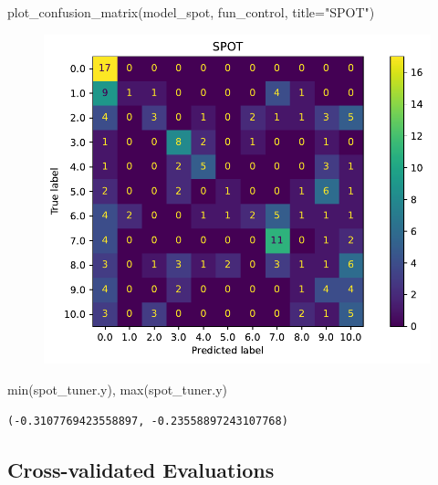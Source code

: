 \documentclass[
  letterpaper,
  DIV=11,
  numbers=noendperiod]{scrreprt}
\newenvironment{Shaded}{\begin{snugshade}}{\end{snugshade}}
\newcommand{\BuiltInTok}[1]{\textcolor[rgb]{0.00,0.23,0.31}{#1}}
\newcommand{\NormalTok}[1]{\textcolor[rgb]{0.00,0.23,0.31}{#1}}
\newcommand{\OperatorTok}[1]{\textcolor[rgb]{0.37,0.37,0.37}{#1}}
\newcommand{\StringTok}[1]{\textcolor[rgb]{0.13,0.47,0.30}{#1}}
\begin{document}
\begin{Shaded}
\begin{Highlighting}[]
\NormalTok{plot\_confusion\_matrix(model\_spot, fun\_control, title}\OperatorTok{=}\StringTok{"SPOT"}\NormalTok{)}
\end{Highlighting}
\end{Shaded}

\begin{figure}[H]

{\centering \includegraphics{19_spot_hpt_sklearn_multiclass_classification_knn_files/figure-pdf/cell-42-output-1.pdf}

}

\end{figure}

\begin{Shaded}
\begin{Highlighting}[]
\BuiltInTok{min}\NormalTok{(spot\_tuner.y), }\BuiltInTok{max}\NormalTok{(spot\_tuner.y)}
\end{Highlighting}
\end{Shaded}

\begin{verbatim}
(-0.3107769423558897, -0.23558897243107768)
\end{verbatim}

\hypertarget{cross-validated-evaluations-3}{%
\subsection{Cross-validated
Evaluations}\label{cross-validated-evaluations-3}}
\end{document}
